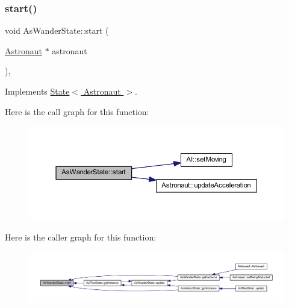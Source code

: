 \subsubsection{\texorpdfstring{start()}{start()}}
{\footnotesize\ttfamily void As\+Wander\+State\+::start (\begin{DoxyParamCaption}\item[{\hyperlink{class_astronaut}{Astronaut} $\ast$}]{astronaut }\end{DoxyParamCaption})\hspace{0.3cm}{\ttfamily [override]}, {\ttfamily [virtual]}}



Implements \hyperlink{class_state_abc29d36b0462a306ac9b32f36571d783}{State$<$ Astronaut $>$}.

Here is the call graph for this function\+:
\nopagebreak
\begin{figure}[H]
\begin{center}
\leavevmode
\includegraphics[width=350pt]{class_as_wander_state_a7821ce2fdac9afa1b111f695ac51af43_cgraph}
\end{center}
\end{figure}
Here is the caller graph for this function\+:
\nopagebreak
\begin{figure}[H]
\begin{center}
\leavevmode
\includegraphics[width=350pt]{class_as_wander_state_a7821ce2fdac9afa1b111f695ac51af43_icgraph}
\end{center}
\end{figure}
\mbox{\label{class_as_wander_state_ab95b3dd74d0f3109a4778fceda43221d}} 
